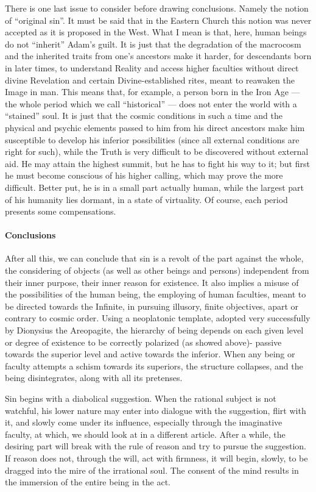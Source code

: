 There is one last issue to consider before drawing conclusions. Namely the notion of ``original sin''. It must be said that in the Eastern Church this notion was never accepted as it is proposed in the West. What I mean is that, here, human beings do not ``inherit'' Adam's guilt. It is just that the degradation of the macrocosm and the inherited traits from one's ancestors make it harder, for descendants born in later times, to understand Reality and access higher faculties without direct divine Revelation and certain Divine-established rites, meant to reawaken the Image in man. This means that, for example, a person born in the Iron Age --- the whole period which we call ``historical'' --- does not enter the world with a ``stained'' soul. It is just that the cosmic conditions in such a time and the physical and psychic elements passed to him from his direct ancestors make him susceptible to develop his inferior possibilities (since all external conditions are right for such), while the Truth is very difficult to be discovered without external aid. He may attain the highest summit, but he has to fight his way to it; but first he must become conscious of his higher calling, which may prove the more difficult. Better put, he is in a small part actually human, while the largest part of his humanity lies dormant, in a state of virtuality. Of course, each period presents some compensations.

\paragraph{Conclusions}


After all this, we can conclude that sin is a revolt of the part against the whole, the considering of objects (as well as other beings and persons) independent from their inner purpose, their inner reason for existence. It also implies a misuse of the possibilities of the human being, the employing of human faculties, meant to be directed towards the Infinite, in pursuing illusory, finite objectives, apart or contrary to cosmic order. Using a neoplatonic template, adopted very successfully by Dionysius the Areopagite, the hierarchy of being depends on each given level or degree of existence to be correctly polarized (as showed above)- passive towards the superior level and active towards the inferior. When any being or faculty attempts a schism towards its superiors, the structure collapses, and the being disintegrates, along with all its pretenses.

Sin begins with a diabolical suggestion. When the rational subject is not watchful, his lower nature may enter into dialogue with the suggestion, flirt with it, and slowly come under its influence, especially through the imaginative faculty, at which, we should look at in a different article. After a while, the desiring part will break with the rule of reason and try to pursue the suggestion. If reason does not, through the will, act with firmness, it will begin, slowly, to be dragged into the mire of the irrational soul. The consent of the mind results in the immersion of the entire being in the act.

